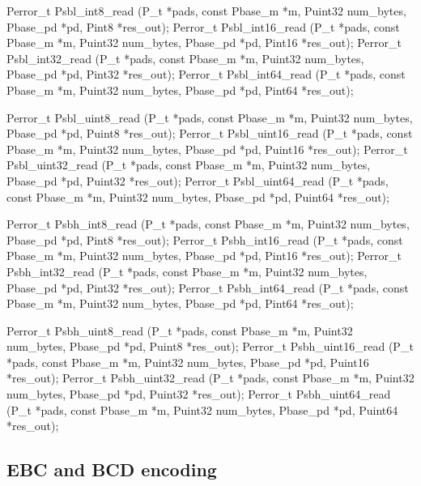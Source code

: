 \begin{tinycodeaux}{\leftmargin=0in}
\codeallowbreaks
Perror_t Psbl_int8_read    (P_t *pads, const Pbase_m *m, Puint32 num_bytes,
			    Pbase_pd *pd, Pint8 *res_out);
Perror_t Psbl_int16_read   (P_t *pads, const Pbase_m *m, Puint32 num_bytes,
			    Pbase_pd *pd, Pint16 *res_out);
Perror_t Psbl_int32_read   (P_t *pads, const Pbase_m *m, Puint32 num_bytes,
			    Pbase_pd *pd, Pint32 *res_out);
Perror_t Psbl_int64_read   (P_t *pads, const Pbase_m *m, Puint32 num_bytes,
			    Pbase_pd *pd, Pint64 *res_out);

Perror_t Psbl_uint8_read   (P_t *pads, const Pbase_m *m, Puint32 num_bytes,
			    Pbase_pd *pd, Puint8 *res_out);
Perror_t Psbl_uint16_read  (P_t *pads, const Pbase_m *m, Puint32 num_bytes,
			    Pbase_pd *pd, Puint16 *res_out);
Perror_t Psbl_uint32_read  (P_t *pads, const Pbase_m *m, Puint32 num_bytes,
			    Pbase_pd *pd, Puint32 *res_out);
Perror_t Psbl_uint64_read  (P_t *pads, const Pbase_m *m, Puint32 num_bytes,
			    Pbase_pd *pd, Puint64 *res_out);

Perror_t Psbh_int8_read    (P_t *pads, const Pbase_m *m, Puint32 num_bytes,
			    Pbase_pd *pd, Pint8 *res_out);
Perror_t Psbh_int16_read   (P_t *pads, const Pbase_m *m, Puint32 num_bytes,
			    Pbase_pd *pd, Pint16 *res_out);
Perror_t Psbh_int32_read   (P_t *pads, const Pbase_m *m, Puint32 num_bytes,
			    Pbase_pd *pd, Pint32 *res_out);
Perror_t Psbh_int64_read   (P_t *pads, const Pbase_m *m, Puint32 num_bytes,
			    Pbase_pd *pd, Pint64 *res_out);

Perror_t Psbh_uint8_read   (P_t *pads, const Pbase_m *m, Puint32 num_bytes,
			    Pbase_pd *pd, Puint8 *res_out);
Perror_t Psbh_uint16_read  (P_t *pads, const Pbase_m *m, Puint32 num_bytes,
			    Pbase_pd *pd, Puint16 *res_out);
Perror_t Psbh_uint32_read  (P_t *pads, const Pbase_m *m, Puint32 num_bytes,
			    Pbase_pd *pd, Puint32 *res_out);
Perror_t Psbh_uint64_read  (P_t *pads, const Pbase_m *m, Puint32 num_bytes,
			    Pbase_pd *pd, Puint64 *res_out);
\end{tinycodeaux}

\subsection{EBC and BCD encoding}

\cBegin{}
\cEnd{}


